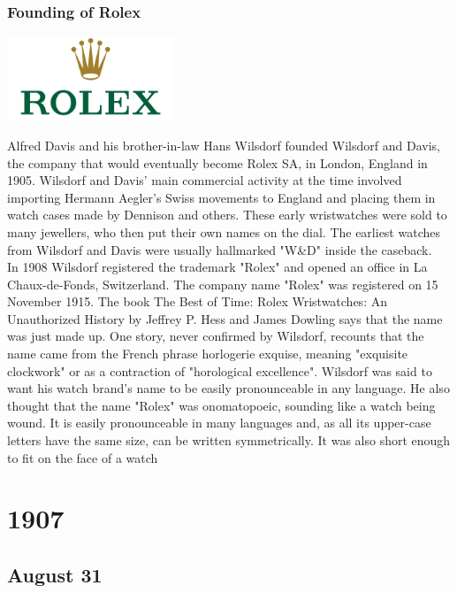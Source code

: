 \documentclass[11pt]{report}
\begin{document}
\section{}
\subsection{Founding of Rolex}
\vspace{2mm}\begin{center}\includegraphics[width=5cm]{./img/rolexLogo.jpg}\end{center}
Alfred Davis and his brother-in-law Hans Wilsdorf founded Wilsdorf and Davis, the company that would eventually become Rolex SA, in London, England in 1905. Wilsdorf and Davis' main commercial activity at the time involved importing Hermann Aegler's Swiss movements to England and placing them in watch cases made by Dennison and others. These early wristwatches were sold to many jewellers, who then put their own names on the dial. The earliest watches from Wilsdorf and Davis were usually hallmarked "W\&D" inside the caseback.\\
\indent In 1908 Wilsdorf registered the trademark "Rolex" and opened an office in La Chaux-de-Fonds, Switzerland. The company name "Rolex" was registered on 15 November 1915. The book The Best of Time: Rolex Wristwatches: An Unauthorized History by Jeffrey P. Hess and James Dowling says that the name was just made up. One story, never confirmed by Wilsdorf, recounts that the name came from the French phrase horlogerie exquise, meaning "exquisite clockwork" or as a contraction of "horological excellence". Wilsdorf was said to want his watch brand's name to be easily pronounceable in any language. He also thought that the name "Rolex" was onomatopoeic, sounding like a watch being wound. It is easily pronounceable in many languages and, as all its upper-case letters have the same size, can be written symmetrically. It was also short enough to fit on the face of a watch

\chapter{1907}
\section{August 31}
\end{document}
